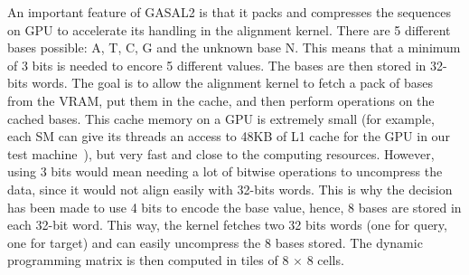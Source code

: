%		
%			
%			
%			
%		
%		
%	
%		
%

An important feature of GASAL2 is that it packs and compresses the sequences on GPU to accelerate its handling in the alignment kernel. There are 5 different bases possible: A, T, C, G and the unknown base N. This means that a minimum of 3 bits is needed to encore 5 different values. The bases are then stored in 32-bits words. The goal is to allow the alignment kernel to fetch a pack of bases from the VRAM, put them in the cache, and then perform operations on the cached bases. This cache memory on a GPU is extremely small (for example, each SM can give its threads an access to 48KB of L1 cache for the GPU in our test machine~\cite{nvidia:keplerarch}), but very fast and close to the computing resources.
However, using 3 bits would mean needing a lot of bitwise operations to uncompress the data, since it would not align easily with 32-bits words. This is why the decision has been made to use 4 bits to encode the base value, hence, 8 bases are stored in each 32-bit word. This way, the kernel fetches two 32 bits words (one for query, one for target) and can easily uncompress the 8 bases stored. The dynamic programming matrix is then computed in tiles of 8 $\times$ 8 cells.


